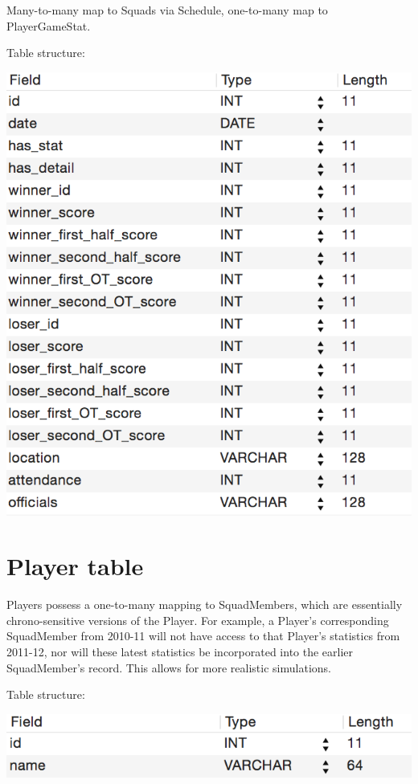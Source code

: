 \documentclass[letterpaper,10pt,english]{sphinxmanual}
\begin{document}
Many-to-many map to Squads via Schedule, one-to-many map to PlayerGameStat.

Table structure:

\includegraphics{game_table.png}


\section{Player table}
\label{_static/database:player-table}
Players possess a one-to-many mapping to SquadMembers,
which are essentially chrono-sensitive versions of the Player. For
example, a Player's corresponding SquadMember from 2010-11 will not
have access to that Player's statistics from 2011-12, nor will these
latest statistics be incorporated into the earlier SquadMember's record.
This allows for more realistic simulations.

Table structure:

\includegraphics{player_table.png}
\end{document}
